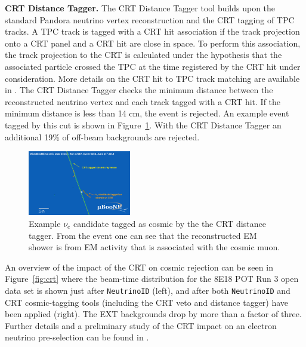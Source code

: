 \textbf{CRT Distance Tagger.} 
The CRT Distance Tagger tool builds upon the standard Pandora neutrino vertex reconstruction and the CRT tagging of TPC tracks. A TPC track is tagged with a CRT hit association if the track projection onto a CRT panel and a CRT hit are close in space. 
To perform this association, the track projection to the CRT is calculated under the hypothesis that the associated particle crossed the TPC at the time registered by the CRT hit under consideration. More details on the CRT hit to TPC track matching are available in \cite{bib:CRTPresel_Technote}.  The CRT Distance Tagger checks the minimum distance between the reconstructed neutrino vertex and each track tagged with a CRT hit. If the minimum distance is less than 14 cm, the event is rejected. An example event tagged by this cut is shown in Figure~\ref{fig:crtdist00}.  With the CRT Distance Tagger an additional 19\% of off-beam backgrounds are rejected.%
 
\begin{figure}[h!]
\centering
\includegraphics[width=0.4\textwidth]{NuId-Ch3/Images/crttagger_01.png}
\caption{Example $\nu_e$ candidate tagged as cosmic by the the CRT distance tagger. From the event one can see that the reconstructed EM shower is from EM activity that is associated with the cosmic muon.}
\label{fig:crtdist00}
\end{figure}

An overview of the impact of the CRT on cosmic rejection can be seen in Figure~\ref{fig:crt} where the beam-time distribution for the 8E18 POT Run 3 open data set is shown just after \texttt{NeutrinoID} (left), and after both \texttt{NeutrinoID} and CRT cosmic-tagging tools (including the CRT veto and distance tagger) have been applied (right). The EXT backgrounds drop by more than a factor of three.
Further details and a preliminary study of the CRT  impact on an electron neutrino pre-selection can be found in \cite{bib:CRTPresel_Technote}. 

